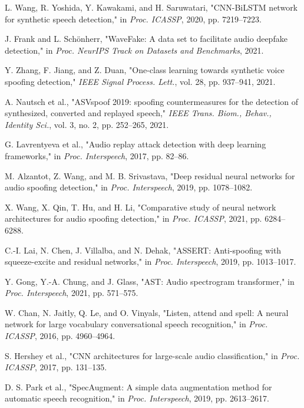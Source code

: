 \documentclass[conference]{IEEEtran}
\begin{document}
\begin{thebibliography}{00}
 L. Wang, R. Yoshida, Y. Kawakami, and H. Saruwatari, "CNN-BiLSTM network for synthetic speech detection," in \textit{Proc. ICASSP}, 2020, pp. 7219--7223.

 J. Frank and L. Schönherr, "WaveFake: A data set to facilitate audio deepfake detection," in \textit{Proc. NeurIPS Track on Datasets and Benchmarks}, 2021.

 Y. Zhang, F. Jiang, and Z. Duan, "One-class learning towards synthetic voice spoofing detection," \textit{IEEE Signal Process. Lett.}, vol. 28, pp. 937--941, 2021.

 A. Nautsch et al., "ASVspoof 2019: spoofing countermeasures for the detection of synthesized, converted and replayed speech," \textit{IEEE Trans. Biom., Behav., Identity Sci.}, vol. 3, no. 2, pp. 252--265, 2021.

 G. Lavrentyeva et al., "Audio replay attack detection with deep learning frameworks," in \textit{Proc. Interspeech}, 2017, pp. 82--86.

 M. Alzantot, Z. Wang, and M. B. Srivastava, "Deep residual neural networks for audio spoofing detection," in \textit{Proc. Interspeech}, 2019, pp. 1078--1082.

 X. Wang, X. Qin, T. Hu, and H. Li, "Comparative study of neural network architectures for audio spoofing detection," in \textit{Proc. ICASSP}, 2021, pp. 6284--6288.

 C.-I. Lai, N. Chen, J. Villalba, and N. Dehak, "ASSERT: Anti-spoofing with squeeze-excite and residual networks," in \textit{Proc. Interspeech}, 2019, pp. 1013--1017.

 Y. Gong, Y.-A. Chung, and J. Glass, "AST: Audio spectrogram transformer," in \textit{Proc. Interspeech}, 2021, pp. 571--575.

 W. Chan, N. Jaitly, Q. Le, and O. Vinyals, "Listen, attend and spell: A neural network for large vocabulary conversational speech recognition," in \textit{Proc. ICASSP}, 2016, pp. 4960--4964.

 S. Hershey et al., "CNN architectures for large-scale audio classification," in \textit{Proc. ICASSP}, 2017, pp. 131--135.

 D. S. Park et al., "SpecAugment: A simple data augmentation method for automatic speech recognition," in \textit{Proc. Interspeech}, 2019, pp. 2613--2617.


\end{thebibliography}
\end{document}
